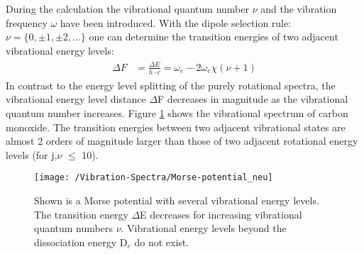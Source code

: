 During the calculation the vibrational quantum number $\nu$ and the vibration frequency $\omega$ have been introduced. With the dipole selection rule: $\nu = \{0,\pm1,\pm2,...\}$ one can determine the transition energies of two adjacent vibrational energy levels:
\begin{align}
\begin{split}
\Delta F &= \frac{\Delta E}{h\cdot c} = \omega_e -2\omega_e \chi (\nu +1)
\label{vibration_transition_energy}
\end{split}
\end{align}
In contrast to the energy level splitting of the purely rotational spectra, the vibrational energy level distance $\Delta$F decreases in magnitude as the vibrational quantum number increases. Figure \ref{Figure:Morse-potential} shows the vibrational spectrum of carbon monoxide. The transition energies between two adjacent vibrational states are almost 2 orders of magnitude larger than those of two adjacent rotational energy levels (for j,$\nu$ $\leq$ 10).
\begin{figure}[H]
	\centering
	\texttt{[image: /Vibration-Spectra/Morse-potential\_neu]}
	\caption{Shown is a Morse potential with several vibrational energy levels. The transition energy $\Delta$E decreases for increasing vibrational quantum numbers $\nu$. Vibrational energy levels beyond the dissociation energy D$_e$ do not exist. }
	\label{Figure:Morse-potential}
\end{figure}
